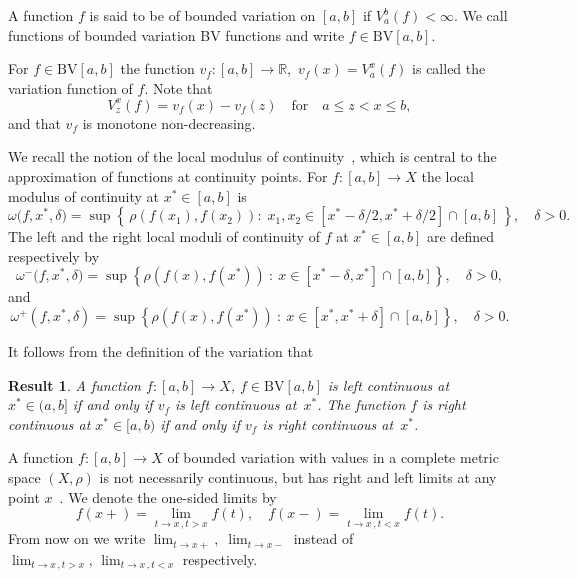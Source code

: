 \documentclass[final,3p,mathptmx]{article}%
\newcommand{\R}{{\mathbb R}}
\newcommand{\BV}{\mathrm{BV}[a,b]}
\newcommand{\LeftLocalModul}[3]{\omega^{-}\big( {#1},{#2},{#3} \big)}
\newcommand{\LocalModulCont}[3]{\omega\big( {#1},{#2},{#3} \big)}
\newtheorem{result}[remark]{Result}
\begin{document}
{{{{A function $f$ is said to be of bounded variation on $[a,b]$ if ${ V_{a}^{b}(f) < \infty}$. We call functions of bounded variation BV functions and write $f \in \BV$.  

For $f \in \BV$ the  function $v_f:[a,b]\rightarrow \R$,\, $v_f(x)=V_{a}^{x}(f)$ is called the variation function of $f$. Note that 
$$
V_{z}^{x}(f)=v_f(x)-v_f(z) \quad  \mbox{for} \quad a\le z<x \le b,
$$
and that $v_f$ is monotone non-decreasing.

We recall the notion of the local modulus of continuity~\cite{SendovPopov}, which is central to the approximation of functions at continuity points.
For $f : [a,b] \to X$  the local modulus of continuity at $x^* \in [a,b]$ is
$$%
	\LocalModulCont{f}{x^*}{\delta} = \sup \left\{\, \rho(f(x_1),f(x_2)): \; x_1,x_2 \in \left[x^*-\delta/2,x^*+\delta/2 \right]\cap[a,b] \,\right\},\quad \delta >0.
$$%
The left and the right local moduli of continuity of $f$ at $x^*\in[a,b]$  are defined respectively  by
$$
\LeftLocalModul{f}{x^*}{\delta}=\sup \left\{ \rho(f(x),f(x^*)) \ :\ x\in [x^*-\delta, x^*] \cap [a,b] \right \},\quad \delta>0,
$$
and
$$
\omega^{+}(f,x^*,\delta)=\sup \left \{\rho(f(x),f(x^*)) \ : \ x\in [x^*,x^*+\delta] \cap [a,b] \right \},\quad \delta>0.
$$


It follows from the definition of the variation that~%

\begin{result}\label{Result_f_OneSidedCont->v_f_OneSidedCont}
		A function $f:[a,b]\to X$, $f \in \BV$ is left continuous at $x^*\in (a,b]$ if and only if $v_f$ is left continuous at~$x^*$.
		The function $f$ is right continuous at $x^* \in [a,b)$ if and only if $v_f$ is right continuous at~$x^*$.
\end{result}

A function $f : [a,b] \to X$ of bounded variation with values in a complete metric space $(X,\rho)$ is not necessarily continuous, but has right and left limits at any point $x$~\cite{Chistyakov:On_BV-mappings}. 
We denote the one-sided limits by
$$ 
f(x+) = \lim_{ t \to x \, , t>x } f(t), \quad f(x-) = \lim_{ t \to x\, , t<x } f(t) .
$$  
From now on we write $\displaystyle \lim_{ t \to x+ },\; \lim_{ t \to x- }$ 
instead of $\displaystyle \lim_{ t \to x \, , t>x },\, \lim_{ t \to x \, , t<x }$ respectively.
\smallskip


}}}}
\end{document}
